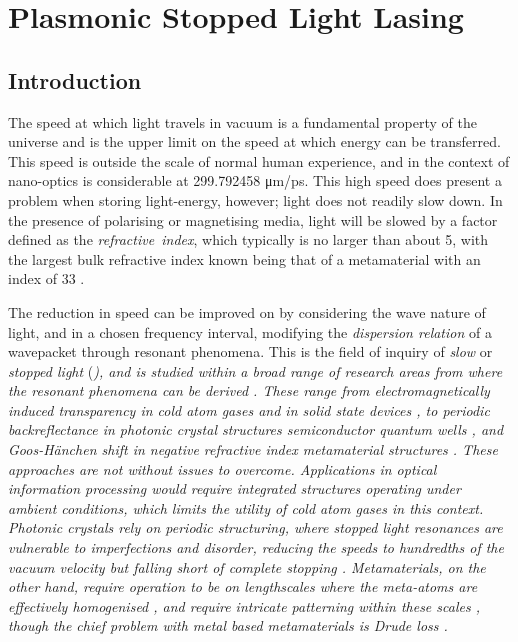 \chapter{Plasmonic Stopped Light Lasing}

\section{Introduction} \label{sec:sllIntro}
The speed at which light travels in vacuum is a fundamental property of the
universe and is the upper limit on the speed at which energy can be
transferred.
This speed is outside the scale of normal human experience, and in the context
of nano-optics is considerable at 299.792458 μm/ps.
This high speed does present a problem when storing light-energy, however;
light does not readily slow down.
In the presence of polarising or magnetising media, light will be slowed by a
factor defined as the \emph{refractive index}, which typically is no larger than
about 5, with the largest bulk refractive index known being that of a
metamaterial with an index of 33 \cite{Choi2011}.

The reduction in speed can be improved on by considering the wave nature of
light, and in a chosen frequency interval, modifying the
\emph{dispersion relation} of a wavepacket through resonant phenomena.
This is the field of inquiry of \emph{slow} or \emph{stopped light} (\sl), and
is studied within a broad range of research areas from where the resonant
phenomena can be derived \cite{Khurgin2005}.
These range from
\emph{electromagnetically induced transparency} in cold atom gases
\cite{Hau1999,Liu2001,Lukin2001,Boyd2009}
and in solid state devices
\cite{Ibanescu2004,Yanik2004,Ibanescu2005,Zhang2008,Papasimakis2008},
to \emph{periodic backreflectance} in photonic crystal structures
\cite{Vlasov2005,Krauss2007,Baba2008}
semiconductor quantum wells \cite{Ku2004},
and \emph{Goos-Hänchen shift} \cite{Berman2002} in negative refractive index
metamaterial structures \cite{Tsakmakidis2007,Kirby2011}.
These approaches are not without issues to overcome.
Applications in optical information processing would require integrated
structures operating under ambient conditions, which limits the utility of cold
atom gases in this context.
Photonic crystals rely on periodic structuring, where stopped light resonances
are vulnerable to imperfections and disorder, reducing the speeds to
hundredths of the vacuum velocity but falling short of complete stopping
\cite{Mookherjea2007,Engelen2008}.
Metamaterials, on the other hand, require operation to be on lengthscales where
the meta-atoms are effectively homogenised \cite{Smith2004}, and require
intricate patterning within these scales \cite{Zhang2005,Valentine2008}, though
the chief problem with metal based metamaterials is Drude loss
\cite{Stockman2007,Kinsler2008}.

